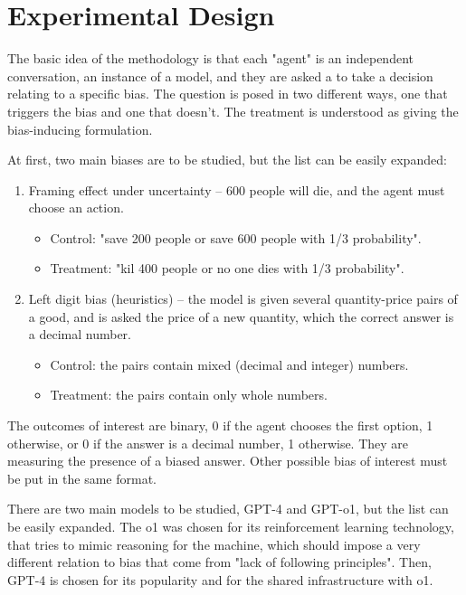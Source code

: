 \documentclass[12pt]{article}
\begin{document}
\section*{Experimental Design}

The basic idea of the methodology is that each "agent" is an independent conversation, an instance of a model, and they are asked a to take a decision relating to a specific bias. The question is posed in two different ways, one that triggers the bias and one that doesn't. The treatment is understood as giving the bias-inducing formulation.

At first, two main biases are to be studied, but the list can be easily expanded:

\begin{enumerate}
  \item Framing effect under uncertainty -- 600 people will die, and the agent must choose an action.
  \begin{itemize}
    \item Control: "save 200 people or save 600 people with 1/3 probability".
    \item Treatment: "kil 400 people or no one dies with 1/3 probability".
  \end{itemize} 
  \item Left digit bias (heuristics) -- the model is given several quantity-price pairs of a good, and is asked the price of a new quantity, which the correct answer is a decimal number.
  \begin{itemize}
    \item Control: the pairs contain mixed (decimal and integer) numbers.
    \item Treatment: the pairs contain only whole numbers.
  \end{itemize}  
\end{enumerate}

The outcomes of interest are binary, 0 if the agent chooses the first option, 1 otherwise, or 0 if the answer is a decimal number, 1 otherwise. They are measuring the presence of a biased answer. Other possible bias of interest must be put in the same format.

There are two main models to be studied, GPT-4 and GPT-o1, but the list can be easily expanded. The o1 was chosen for its reinforcement learning technology, that tries to mimic reasoning for the machine, which should impose a very different relation to bias that come from "lack of following principles". Then, GPT-4 is chosen for its popularity and for the shared infrastructure with o1.
\end{document}
